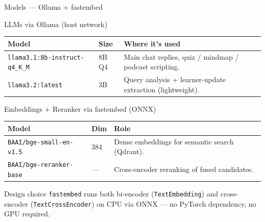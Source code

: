 \documentclass[aspectratio=169, 10pt]{beamer}
\begin{document}
\begin{frame}{Models --- Ollama + fastembed}
  \begin{block}{LLMs via Ollama (host network)}
    \scriptsize
    \begin{tabular}{p{4.5cm} p{1.4cm} p{6.5cm}}
      \toprule
      \textbf{Model} & \textbf{Size} & \textbf{Where it's used} \\
      \midrule
      \texttt{llama3.1:8b-instruct-q4\_K\_M} & 8B Q4 & Main chat replies, quiz / mindmap / podcast scripting. \\
      \texttt{llama3.2:latest}               & 3B    & Query analysis + learner-update extraction (lightweight). \\
      \bottomrule
    \end{tabular}
  \end{block}

  \begin{block}{Embeddings + Reranker via fastembed (ONNX)}
    \scriptsize
    \begin{tabular}{p{4.5cm} p{1.4cm} p{6.5cm}}
      \toprule
      \textbf{Model} & \textbf{Dim} & \textbf{Role} \\
      \midrule
      \texttt{BAAI/bge-small-en-v1.5}     & 384 & Dense embeddings for semantic search (Qdrant). \\
      \texttt{BAAI/bge-reranker-base}     & --- & Cross-encoder reranking of fused candidates. \\
      \bottomrule
    \end{tabular}
  \end{block}

  \begin{exampleblock}{Design choice}
    \scriptsize
    \texttt{fastembed} runs both bi-encoder (\texttt{TextEmbedding}) and
    cross-encoder (\texttt{TextCrossEncoder}) on CPU via ONNX --- no
    PyTorch dependency, no GPU required.
  \end{exampleblock}
\end{frame}
\end{document}
